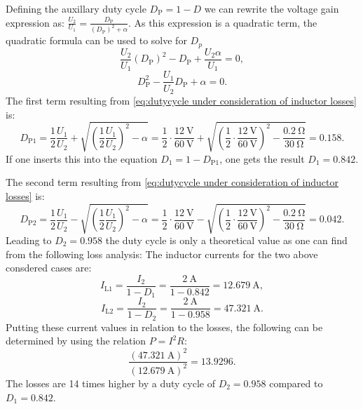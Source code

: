 \begin{solutionblock}
Defining the auxillary duty cycle $D_\mathrm{P}=1-D$ we can rewrite the voltage gain expression as: $\frac{U_\mathrm{2}}{U_\mathrm{1}}=\frac{D_\mathrm{P}}{(D_\mathrm{P})^2+\alpha}$.
As this expression is a quadratic term, the quadratic formula  can be used to solve for $D_p$
\begin{equation}
    \frac{U_\mathrm{2}}{U_\mathrm{1}}(D_\mathrm{P})^2-D_\mathrm{P}+\frac{U_\mathrm{2}\alpha}{U_\mathrm{1}}=0,
\end{equation}
\begin{equation}
    D_\mathrm{P}^2 - \frac{U_\mathrm{1}}{U_\mathrm{2}} D_\mathrm{P}+\alpha=0. \label{eq:dutycycle under consideration of inductor losses}
\end{equation}
The first term resulting from \eqref{eq:dutycycle under consideration of inductor losses} is:
\begin{equation}
    D_\mathrm{P1}=\frac{1}{2}\frac{U_\mathrm{1}}{U_\mathrm{2}}+\sqrt{\left(\frac{1}{2}\frac{U_\mathrm{1}}{U_\mathrm{2}}\right)^2-\alpha}= \frac{1}{2}\cdot\frac{\SI{12}{\volt}}{\SI{60}{\volt}}+\sqrt{\left({\frac{1}{2}}\cdot\frac{\SI{12}{\volt}}{\SI{60}{\volt}}\right)^2-\frac{\SI{0.2}{\ohm}}{\SI{30}{\ohm}}}= 0.158.
\end{equation}
If one inserts this into the equation $D_\mathrm{1}=1-D_\mathrm{P1}$, one gets the result $D_\mathrm{1}=0.842$.

The second term resulting from \eqref{eq:dutycycle under consideration of inductor losses} is:
\begin{equation}
    D_\mathrm{P2}=\frac{1}{2}\frac{U_\mathrm{1}}{U_\mathrm{2}}-\sqrt{\left(\frac{1}{2}\frac{U_\mathrm{1}}{U_\mathrm{2}}\right)^2-\alpha}= \frac{1}{2}\cdot\frac{\SI{12}{\volt}}{\SI{60}{\volt}}-\sqrt{\left({\frac{1}{2}}\cdot\frac{\SI{12}{\volt}}{\SI{60}{\volt}}\right)^2-\frac{\SI{0.2}{\ohm}}{\SI{30}{\ohm}}}= 0.042.
\end{equation}
Leading to $D_\mathrm{2}=0.958$ the duty cycle is only a theoretical value as one can find from the following loss analysis: The inductor currents for the two above consdered cases are:
\begin{equation}
    I_\mathrm{L1} = \frac{I_\mathrm{2}}{1-D_\mathrm{1}}= \frac{\SI{2}{\ampere}}{1-0.842}=\SI{12.679}{\ampere},
\end{equation}
\begin{equation}
    I_\mathrm{L2} = \frac{I_\mathrm{2}}{1-D_\mathrm{2}}= \frac{\SI{2}{\ampere}}{1-0.958}=\SI{47.321}{\ampere}.
\end{equation}
Putting these current values in relation to the losses, the following can be determined by using the relation $P=I^2R$:
\begin{equation}
    \frac{(\SI{47.321}{\ampere})^2}{(\SI{12.679}{\ampere})^2}=13.9296.
\end{equation}
The losses are 14 times higher by a duty cycle of $D_\mathrm{2}=0.958$ compared to $D_\mathrm{1}=0.842$. 


\end{solutionblock}
